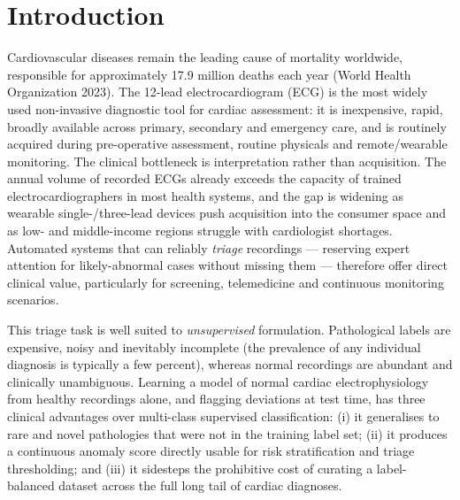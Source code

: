 \documentclass{iopjournal}
\begin{document}
\section{Introduction}

Cardiovascular diseases remain the leading cause of mortality worldwide, responsible for approximately 17.9 million deaths each year (World Health Organization 2023). The 12-lead electrocardiogram (ECG) is the most widely used non-invasive diagnostic tool for cardiac assessment: it is inexpensive, rapid, broadly available across primary, secondary and emergency care, and is routinely acquired during pre-operative assessment, routine physicals and remote/wearable monitoring. The clinical bottleneck is interpretation rather than acquisition. The annual volume of recorded ECGs already exceeds the capacity of trained electrocardiographers in most health systems, and the gap is widening as wearable single-/three-lead devices push acquisition into the consumer space and as low- and middle-income regions struggle with cardiologist shortages. Automated systems that can reliably \emph{triage} recordings --- reserving expert attention for likely-abnormal cases without missing them --- therefore offer direct clinical value, particularly for screening, telemedicine and continuous monitoring scenarios.

This triage task is well suited to \emph{unsupervised} formulation. Pathological labels are expensive, noisy and inevitably incomplete (the prevalence of any individual diagnosis is typically a few percent), whereas normal recordings are abundant and clinically unambiguous. Learning a model of normal cardiac electrophysiology from healthy recordings alone, and flagging deviations at test time, has three clinical advantages over multi-class supervised classification: (i) it generalises to rare and novel pathologies that were not in the training label set; (ii) it produces a continuous anomaly score directly usable for risk stratification and triage thresholding; and (iii) it sidesteps the prohibitive cost of curating a label-balanced dataset across the full long tail of cardiac diagnoses.
\end{document}
